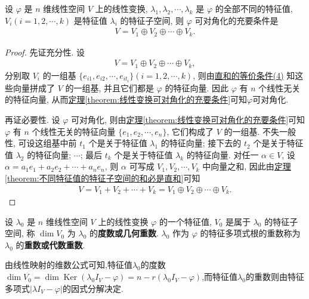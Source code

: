 \documentclass[../../main.tex]{subfiles}%
\begin{document}
\begin{theorem}[线性变换可对角化的充要条件]\label{theorem:线性变换可对角化的充要条件2}
设 $\varphi$ 是 $n$ 维线性空间 $V$ 上的线性变换, $\lambda_1, \lambda_2, \cdots, \lambda_k$ 是 $\varphi$ 的全部不同的特征值, $V_i (i = 1, 2, \cdots, k)$ 是特征值 $\lambda_i$ 的特征子空间, 则 $\varphi$ 可对角化的充要条件是
\begin{align*}
V = V_1 \oplus V_2 \oplus \cdots \oplus V_k.
\end{align*}
\end{theorem}
\begin{proof}

先证充分性. 设
\begin{align*}
V = V_1 \oplus V_2 \oplus \cdots \oplus V_k,
\end{align*}
分别取 $V_i$ 的一组基 $\{e_{i1}, e_{i2}, \cdots, e_{it_i}\} (i = 1, 2, \cdots, k)$, 则由\hyperref[theorem:直和的等价条件]{直和的等价条件(4)} 知这些向量拼成了 $V$ 的一组基, 并且它们都是 $\varphi$ 的特征向量. 因此 $\varphi$ 有 $n$ 个线性无关的特征向量, 从而\hyperref[theorem:线性变换可对角化的充要条件]{定理\ref{theorem:线性变换可对角化的充要条件}}可知$\varphi$可对角化.

再证必要性. 设 $\varphi$ 可对角化, 则由\hyperref[theorem:线性变换可对角化的充要条件]{定理\ref{theorem:线性变换可对角化的充要条件}}可知$\varphi$ 有 $n$ 个线性无关的特征向量 $\{e_1, e_2, \cdots, e_n\}$, 它们构成了 $V$ 的一组基. 不失一般性, 可设这组基中前 $t_1$ 个是关于特征值 $\lambda_1$ 的特征向量; 接下去的 $t_2$ 个是关于特征值 $\lambda_2$ 的特征向量; $\cdots$; 最后 $t_k$ 个是关于特征值 $\lambda_k$ 的特征向量. 对任一 $\alpha \in V$, 设 $\alpha = a_1 e_1 + a_2 e_2 + \cdots + a_n e_n$, 则 $\alpha$ 可写成 $V_1, V_2, \cdots, V_k$ 中向量之和, 因此由\hyperref[theorem:不同特征值的特征子空间的和必是直和]{定理\ref{theorem:不同特征值的特征子空间的和必是直和}}可知
\begin{align*}
V = V_1 + V_2 + \cdots + V_k = V_1 \oplus V_2 \oplus \cdots \oplus V_k.
\end{align*}

\end{proof}


\begin{definition}[线性变换的几何重数与代数重数]
设 $\lambda_0$ 是 $n$ 维线性空间 $V$ 上的线性变换 $\varphi$ 的一个特征值, $V_0$ 是属于 $\lambda_0$ 的特征子空间, 称 $\dim V_0$ 为 $\lambda_0$ 的\textbf{度数或几何重数}. $\lambda_0$ 作为 $\varphi$ 的特征多项式根的重数称为 $\lambda_0$ 的\textbf{重数或代数重数}.
\end{definition}
\begin{note}
由线性映射的维数公式可知,特征值$\lambda_0$的度数$\dim V_0 = \dim \operatorname{Ker}(\lambda_0 I_V - \varphi) = n - r(\lambda_0 I_V - \varphi)$,而特征值$\lambda_0$的重数则由特征多项式$|\lambda I_V - \varphi|$的因式分解决定.
\end{note}
\end{document}
